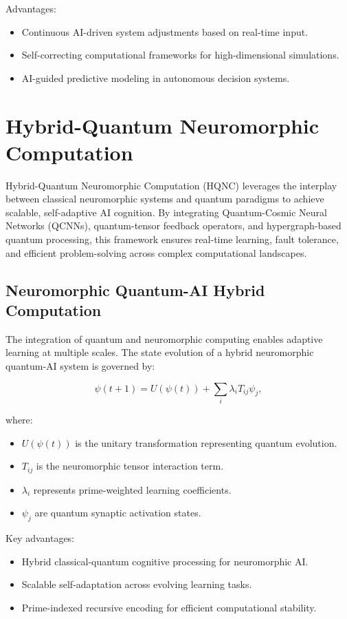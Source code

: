 \documentclass{article}
\theoremstyle{plain}
\begin{document}
Advantages:
\begin{itemize}
    \item Continuous AI-driven system adjustments based on real-time input.
    \item Self-correcting computational frameworks for high-dimensional simulations.
    \item AI-guided predictive modeling in autonomous decision systems.
\end{itemize}

\section{Hybrid-Quantum Neuromorphic Computation}

Hybrid-Quantum Neuromorphic Computation (HQNC) leverages the interplay between classical neuromorphic systems and quantum paradigms to achieve scalable, self-adaptive AI cognition. By integrating Quantum-Cosmic Neural Networks (QCNNs), quantum-tensor feedback operators, and hypergraph-based quantum processing, this framework ensures real-time learning, fault tolerance, and efficient problem-solving across complex computational landscapes.

\subsection{Neuromorphic Quantum-AI Hybrid Computation}

The integration of quantum and neuromorphic computing enables adaptive learning at multiple scales. The state evolution of a hybrid neuromorphic quantum-AI system is governed by:

\begin{equation}
\psi(t+1) = U(\psi(t)) + \sum_{i} \lambda_i T_{ij} \psi_j,
\end{equation}

where:
\begin{itemize}
    \item $U(\psi(t))$ is the unitary transformation representing quantum evolution.
    \item $T_{ij}$ is the neuromorphic tensor interaction term.
    \item $\lambda_i$ represents prime-weighted learning coefficients.
    \item $\psi_j$ are quantum synaptic activation states.
\end{itemize}

Key advantages:
\begin{itemize}
    \item Hybrid classical-quantum cognitive processing for neuromorphic AI.
    \item Scalable self-adaptation across evolving learning tasks.
    \item Prime-indexed recursive encoding for efficient computational stability.
\end{itemize}
\end{document}
